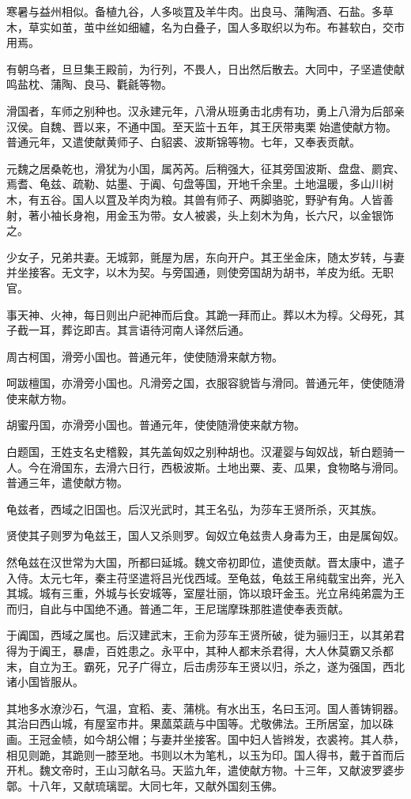 \documentclass[12pt,UTF8]{ctexbook}
\begin{document}
寒暑与益州相似。备植九谷，人多啖罝及羊牛肉。出良马、蒲陶酒、石盐。多草木，草实如茧，茧中丝如细纑，名为白叠子，国人多取织以为布。布甚软白，交市用焉。

有朝乌者，旦旦集王殿前，为行列，不畏人，日出然后散去。大同中，子坚遣使献鸣盐枕、蒲陶、良马、氍毹等物。

滑国者，车师之别种也。汉永建元年，八滑从班勇击北虏有功，勇上八滑为后部亲汉侯。自魏、晋以来，不通中国。至天监十五年，其王厌带夷栗始遣使献方物。普通元年，又遣使献黄师子、白貂裘、波斯锦等物。七年，又奉表贡献。

元魏之居桑乾也，滑犹为小国，属芮芮。后稍强大，征其旁国波斯、盘盘、罽宾、焉耆、龟兹、疏勒、姑墨、于阗、句盘等国，开地千余里。土地温暖，多山川树木，有五谷。国人以罝及羊肉为粮。其兽有师子、两脚骆驼，野驴有角。人皆善射，著小袖长身袍，用金玉为带。女人被裘，头上刻木为角，长六尺，以金银饰之。

少女子，兄弟共妻。无城郭，氈屋为居，东向开户。其王坐金床，随太岁转，与妻并坐接客。无文字，以木为契。与旁国通，则使旁国胡为胡书，羊皮为纸。无职官。

事天神、火神，每日则出户祀神而后食。其跪一拜而止。葬以木为椁。父母死，其子截一耳，葬讫即吉。其言语待河南人译然后通。

周古柯国，滑旁小国也。普通元年，使使随滑来献方物。

呵跋檀国，亦滑旁小国也。凡滑旁之国，衣服容貌皆与滑同。普通元年，使使随滑使来献方物。

胡蜜丹国，亦滑旁小国也。普通元年，使使随滑使来献方物。

白题国，王姓支名史稽毅，其先盖匈奴之别种胡也。汉灌婴与匈奴战，斩白题骑一人。今在滑国东，去滑六日行，西极波斯。土地出粟、麦、瓜果，食物略与滑同。普通三年，遣使献方物。

龟兹者，西域之旧国也。后汉光武时，其王名弘，为莎车王贤所杀，灭其族。

贤使其子则罗为龟兹王，国人又杀则罗。匈奴立龟兹贵人身毒为王，由是属匈奴。

然龟兹在汉世常为大国，所都曰延城。魏文帝初即位，遣使贡献。晋太康中，遣子入侍。太元七年，秦主苻坚遣将吕光伐西域。至龟兹，龟兹王帛纯载宝出奔，光入其城。城有三重，外城与长安城等，室屋壮丽，饰以琅玕金玉。光立帛纯弟震为王而归，自此与中国绝不通。普通二年，王尼瑞摩珠那胜遣使奉表贡献。

于阗国，西域之属也。后汉建武末，王俞为莎车王贤所破，徙为骊归王，以其弟君得为于阗王，暴虐，百姓患之。永平中，其种人都末杀君得，大人休莫霸又杀都末，自立为王。霸死，兄子广得立，后击虏莎车王贤以归，杀之，遂为强国，西北诸小国皆服从。

其地多水潦沙石，气温，宜稻、麦、蒲桃。有水出玉，名曰玉河。国人善铸铜器。其治曰西山城，有屋室市井。果蓏菜蔬与中国等。尤敬佛法。王所居室，加以硃画。王冠金帻，如今胡公帽；与妻并坐接客。国中妇人皆辫发，衣裘袴。其人恭，相见则跪，其跪则一膝至地。书则以木为笔札，以玉为印。国人得书，戴于首而后开札。魏文帝时，王山习献名马。天监九年，遣使献方物。十三年，又献波罗婆步鄣。十八年，又献琉璃罂。大同七年，又献外国刻玉佛。
\end{document}

